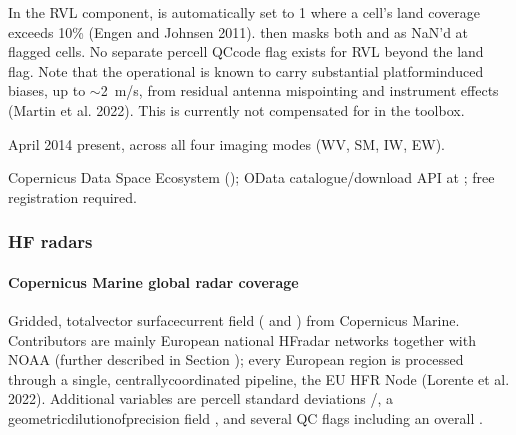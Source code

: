 \documentclass[a4paper,10pt,english]{sphinxmanual}
\begin{document}
\sphinxAtStartPar
{}

\sphinxAtStartPar
In the RVL component,  is automatically set to 1 where a cell’s land coverage exceeds 10\% (Engen and Johnsen 2011).  then masks both  and  as NaN’d at flagged cells. No separate per\sphinxhyphen{}cell QC\sphinxhyphen{}code flag exists for RVL beyond the land flag. Note that the operational  is known to carry substantial platform\sphinxhyphen{}induced biases, up to \(\sim\)2 m/s, from residual antenna mis\sphinxhyphen{}pointing and instrument effects (Martin et al. 2022). This is currently not compensated for in the  toolbox.

\sphinxAtStartPar
{}

 April 2014 \textendash{} present, across all four imaging modes (WV, SM, IW, EW).

\sphinxAtStartPar
{}

\sphinxAtStartPar
Copernicus Data Space Ecosystem (); OData catalogue/download API at ; free registration required.


\subsubsection{HF radars}
\label{\detokenize{05_reference_datasets:hf-radars}}

\paragraph{Copernicus Marine \sphinxhyphen{} global radar coverage}
\label{\detokenize{05_reference_datasets:copernicus-marine-global-radar-coverage}}\label{\detokenize{05_reference_datasets:subpar-hfr-cmems}}
\sphinxAtStartPar
{}

\sphinxAtStartPar
Gridded, total\sphinxhyphen{}vector surface\sphinxhyphen{}current field ( and ) from Copernicus Marine. Contributors are mainly European national HF\sphinxhyphen{}radar networks together with NOAA (further described in Section {\hyperref[\detokenize{05_reference_datasets:subpar-hfr-noaa}]{}}); every European region is processed through a single, centrally\sphinxhyphen{}coordinated pipeline, the EU HFR Node (Lorente et al. 2022). Additional variables are per\sphinxhyphen{}cell standard deviations /, a geometric\sphinxhyphen{}dilution\sphinxhyphen{}of\sphinxhyphen{}precision field , and several QC flags including an overall .
\end{document}
